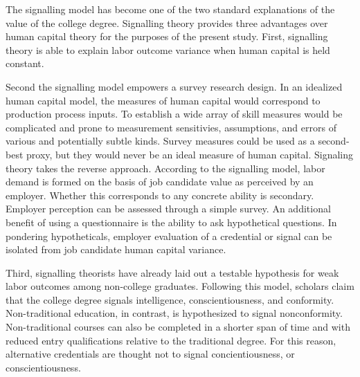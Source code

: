 \documentclass[review]{elsarticle}
\begin{document}


The signalling model has become one of the two standard explanations of the value of the college degree.
Signalling theory provides three advantages over human capital theory for the purposes of the present study.
First, signalling theory is able to explain labor outcome variance when human capital is held constant.

Second the signalling model empowers a survey research design.
In an idealized human capital model, the measures of human capital would correspond to production process inputs.
To establish a wide array of skill measures would be complicated and prone to measurement sensitivies, assumptions, and errors of various and potentially subtle kinds.
Survey measures could be used as a second-best proxy, but they would never be an ideal measure of human capital.
Signaling theory takes the reverse approach.
According to the signalling model, labor demand is formed on the basis of job candidate value as perceived by an employer.
Whether this corresponds to any concrete ability is secondary.
Employer perception can be assessed through a simple survey.
An additional benefit of using a questionnaire is the ability to ask hypothetical questions.
In pondering hypotheticals, employer evaluation of a credential or signal can be isolated from job candidate human capital variance.

Third, signalling theorists have already laid out a testable hypothesis for weak labor outcomes among non-college graduates.
Following this model, scholars claim that the college degree signals intelligence, conscientiousness, and conformity\cite{caplan2018case}.
Non-traditional education, in contrast, is hypothesized to signal nonconformity.
Non-traditional courses can also be completed in a shorter span of time and with reduced entry qualifications relative to the traditional degree.
For this reason, alternative credentials are thought not to signal concientiousness, or conscientiousness.
\end{document}
